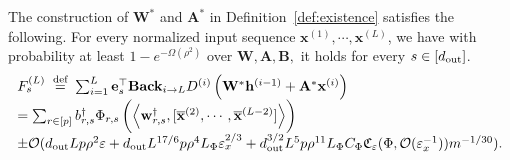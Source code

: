 \begin{theorem}\label{thm:existence_pseudo_proof}
	The construction of $\mathbf{W}^{*}$ and $\mathbf{A}^{\ast}$ in Definition~\ref{def:existence} satisfies the following. For every normalized input sequence $\mathbf{x}^{(1)}, \cdots, \mathbf{x}^{(L)}$, we have with probability at least $1-e^{-\Omega\left(\rho^{2}\right)}$ over $\mathbf{W}, \mathbf{A}, \mathbf{B},$ it holds for every $s \in [d_{\mathrm{out}} ]$.
	$$
	\begin{array}{l}
		F_{s}^{(L)} \stackrel{\text { def }}{=} \sum_{i=1}^{L} \mathbf{e}_{s}^{\top} \mathbf{Back}_{i \rightarrow L} D^{(i)} \left(\mathbf{W}^{\ast} \mathbf{h}^{(i-1)} + \mathbf{A}^{\ast} \mathbf{x}^{(i)}\right) \\
		= \sum_{r \in[p]} b_{r, s}^{\dagger} \Phi_{r, s} \left(\left\langle  \mathbf{w}_{r, s}^{\dagger}, [\overline{\mathbf{x}}^{(2)}, \cdots, \overline{\mathbf{x}}^{(L-2)}]\right\rangle\right)\\ \pm \mathcal{O}(d_{\mathrm{out}} Lp\rho^2 \varepsilon + d_{\mathrm{out}} L^{17/6} p \rho^4 L_{\Phi} \varepsilon_x^{2/3} + d_{\mathrm{out}} ^{3/2}L^5 p \rho^{11} L_{\Phi} C_{\Phi}  \mathfrak{C}_{\varepsilon}(\Phi, \mathcal{O}(\varepsilon_x^{-1}))  m^{-1/30} ).
	\end{array}
	$$

\end{theorem}
